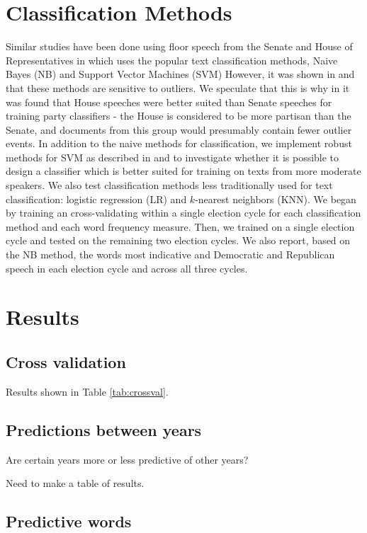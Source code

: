 \documentclass[aps, prl, reprint, showpacs]{revtex4-1}
\begin{document}
\section{Classification Methods}
Similar studies have been done using floor speech from the Senate and House of Representatives in \cite{yu} which uses the popular text classification methods, Naive Bayes (NB) and Support Vector Machines (SVM) However, it was shown in \cite{kwon} and \cite{thomas} that these methods are sensitive to outliers. We speculate that this is why in \cite{yu} it was found that House speeches were better suited than Senate speeches for training party classifiers - the House is considered to be more partisan than the Senate, and documents from this group would presumably contain fewer outlier events. In addition to the naive methods for classification, we implement robust methods for SVM  as described in \cite{chandra} and \cite{xu} to investigate whether it is possible to design a classifier which is better suited for training on texts from more moderate speakers. We also test classification methods less traditionally used for text classification: logistic regression (LR) and $k$-nearest neighbors (KNN). We began by training an cross-validating within a single election cycle for each classification method and each word frequency measure.  Then, we trained on a single election cycle and tested on the remaining two election cycles. We also report, based on the NB method, the words most indicative and Democratic and Republican speech in each election cycle and across all three cycles.

\section{Results}

\subsection{Cross validation}

Results shown in Table \ref{tab:crossval}.

\subsection{Predictions between years}
Are certain years more or less predictive of other years?

Need to make a table of results.

\subsection{Predictive words}
\end{document}
